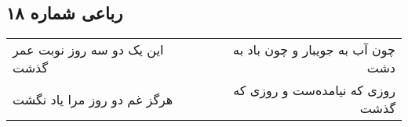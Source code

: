 \begin{center}
\section*{رباعی شماره ۱۸}
\label{sec:sh018}
\begin{longtable}{l p{0.5cm} r}
این یک دو سه روز نوبت عمر گذشت
&&
چون آب به جویبار و چون باد به دشت
\\
هرگز غم دو روز مرا یاد نگشت
&&
روزی که نیامده‌ست و روزی که گذشت
\\
\end{longtable}
\end{center}
